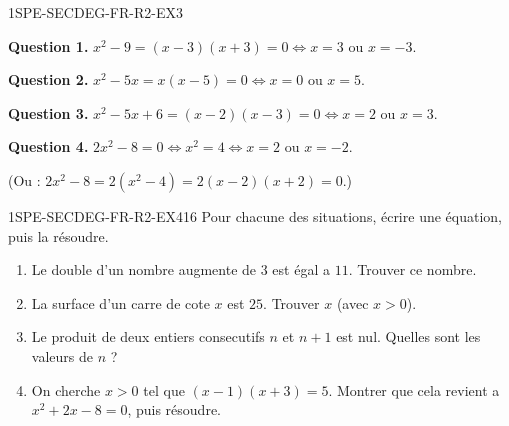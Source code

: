 
\begin{corrige}{1SPE-SECDEG-FR-R2-EX3}

\textbf{Question 1.} $x^2 - 9 = (x-3)(x+3) = 0 \Leftrightarrow x = 3$ ou $x = -3$.

\textbf{Question 2.} $x^2 - 5x = x(x-5) = 0 \Leftrightarrow x = 0$ ou $x = 5$.

\textbf{Question 3.} $x^2 - 5x + 6 = (x-2)(x-3) = 0 \Leftrightarrow x = 2$ ou $x = 3$.

\textbf{Question 4.} $2x^2 - 8 = 0 \Leftrightarrow x^2 = 4 \Leftrightarrow x = 2$ ou $x = -2$.

(Ou : $2x^2 - 8 = 2(x^2-4) = 2(x-2)(x+2) = 0$.)

\end{corrige}


\begin{exercice}{1SPE-SECDEG-FR-R2-EX4}{1}{6}
Pour chacune des situations, écrire une équation, puis la résoudre.
\begin{enumerate}
  \item Le double d'un nombre augmente de $3$ est égal a $11$. Trouver ce nombre.
  \item La surface d'un carre de cote $x$ est $25$. Trouver $x$ (avec $x > 0$).
  \item Le produit de deux entiers consecutifs $n$ et $n+1$ est nul. Quelles sont les valeurs de $n$ ?
  \item On cherche $x > 0$ tel que $(x-1)(x+3) = 5$. Montrer que cela revient a $x^2 + 2x - 8 = 0$, puis résoudre.
\end{enumerate}
\end{exercice}


